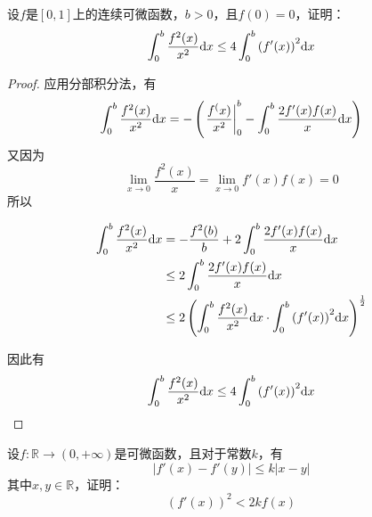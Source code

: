 \begin{proposition}

    设$f$是$[0,1]$上的连续可微函数，$b > 0$，且$f(0) = 0$，证明：
    $$\int_{0}^{b}{\dfrac{f^2(x)}{x^2}}\mathrm{d} x \leq 4\int_{0}^{b}{\left( f'(x)\right)^2 }\mathrm{d} x $$

\end{proposition}

\begin{proof}

    应用分部积分法，有
    $$\int_{0}^{b}{\dfrac{f^2(x)}{x^2}}\mathrm{d} x = - \left( \left.\dfrac{f^(x)}{x^2} \right|_{0}^{b} - \int_{0}^{b}{\dfrac{2f'(x)f(x)}{x}}\mathrm{d} x \right)$$
    又因为
    $$\lim\limits_{x \to 0}{\dfrac{f^2(x)}{x}} = \lim\limits_{x \to 0}{f'(x)f(x)} = 0$$
    所以

    \begin{align*}
        \int_{0}^{b}{\dfrac{f^2(x)}{x^2}}\mathrm{d} x &= -\dfrac{f^2(b)}{b} + 2 \int_{0}^{b}{\dfrac{2f'(x)f(x)}{x}}\mathrm{d} x \\
        & \leq 2\int_{0}^{b}{\dfrac{2f'(x)f(x)}{x}}\mathrm{d} x \\
        & \leq 2\left( \int_{0}^{b}{\dfrac{f^2(x)}{x^2}}\mathrm{d} x \cdot \int_{0}^{b}{\left(f'(x)\right)^2}\mathrm{d} x\right)^{\frac{1}{2}}
    \end{align*}

    因此有
    $$\int_{0}^{b}{\dfrac{f^2(x)}{x^2}}\mathrm{d} x \leq 4\int_{0}^{b}{\left( f'(x)\right)^2 }\mathrm{d} x $$

\end{proof}

\begin{proposition}

    设$f:\mathbb{R} \to (0 ,+\infty)$是可微函数，且对于常数$k$，有
    $$|f'(x) - f'(y)| \leq k|x - y|$$
    其中$x,y \in \mathbb{R}$，证明：
    $$\left( f'(x) \right)^2 < 2kf(x)$$

\end{proposition}

